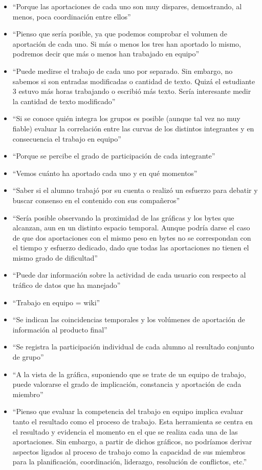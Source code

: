 \begin{itemize}
\item ``Porque las aportaciones de cada uno son muy dispares, demostrando, al menos, poca coordinación entre ellos''
\item ``Pienso que sería posible, ya que podemos comprobar el volumen de aportación de cada uno. Si más o menos los tres han aportado lo mismo, podremos decir que más o menos han trabajado en equipo''
\item ``Puede medirse el trabajo de cada uno por separado. Sin embargo, no sabemos si son entradas modificadas o cantidad de texto. Quizá el estudiante 3 estuvo más horas trabajando o escribió más texto. Sería interesante medir la cantidad de texto modificado''
\item ``Si se conoce quién integra los grupos es posible (aunque tal vez no muy fiable) evaluar la correlación entre las curvas de los distintos integrantes y en consecuencia el trabajo en equipo''
\item ``Porque se percibe el grado de participación de cada integrante''
\item ``Vemos cuánto ha aportado cada uno y en qué momentos''
\item ``Saber si el alumno trabajó por su cuenta o realizó un esfuerzo para debatir y buscar consenso en el contenido con sus compañeros''
\item ``Sería posible observando la proximidad de las gráficas y los bytes que alcanzan, aun en un distinto espacio temporal. Aunque podría darse el caso de que dos aportaciones con el mismo peso en bytes no se correspondan con el tiempo y esfuerzo dedicado, dado que todas las aportaciones no tienen el mismo grado de dificultad''
\item ``Puede dar información sobre la actividad de cada usuario con respecto al tráfico de datos que ha manejado''
\item ``Trabajo en equipo = wiki''
\item ``Se indican las coincidencias temporales y los volúmenes de aportación de información al producto final''
\item ``Se registra la participación individual de cada alumno al resultado conjunto de grupo''
\item ``A la vista de la gráfica, suponiendo que se trate de un equipo de trabajo, puede valorarse el grado de implicación, constancia y aportación de cada miembro''
\item ``Pienso que evaluar la competencia del trabajo en equipo implica evaluar tanto el resultado como el proceso de trabajo. Esta herramienta se centra en el resultado y evidencia el momento en el que se realiza cada una de las aportaciones. Sin embargo, a partir de dichos gráficos, no podríamos  derivar aspectos ligados al proceso de trabajo como la capacidad de sus miembros para la planificación, coordinación, liderazgo, resolución de conflictos, etc.''

\end{itemize}
